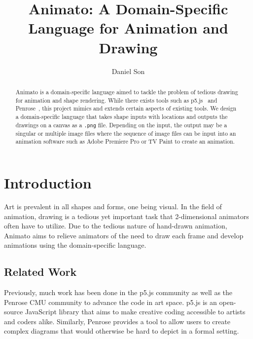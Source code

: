 \documentclass[acmsmall,screen]{acmart}
\begin{document}
\title{Animato: A Domain-Specific Language for Animation and Drawing}

\author{Daniel Son}

\renewcommand{\shortauthors}{Daniel Son}

\renewcommand\footnotetextcopyrightpermission[1]{}
\pagestyle{fancy}
\fancyfoot{}
\makeatletter
\let\@authorsaddresses\@empty
\makeatother

\begin{abstract}
    Animato is a domain-specific language aimed to tackle the problem of tedious drawing for animation and shape rendering.
    While there exists tools such as p5.js~\cite{p5js} and Penrose~\cite{penrose}, this project mimics and extends certain aspects of existing tools.
    We design a domain-specific language that takes shape inputs with locations and outputs the drawings on a canvas as a \texttt{.png} file.
    Depending on the input, the output may be a singular or multiple image files where the sequence of image files can be input into an animation software such as Adobe Premiere Pro or TV Paint to create an animation.
\end{abstract}


\maketitle
\thispagestyle{firstfancy}

\section{Introduction}
Art is prevalent in all shapes and forms, one being visual.
In the field of animation, drawing is a tedious yet important task that 2-dimensional animators often have to utilize.
Due to the tedious nature of hand-drawn animation, Animato aims to relieve animators of the need to draw each frame and develop animations using the domain-specific language.

\subsection{Related Work}
Previously, much work has been done in the p5.js \cite{p5js} community as well as the Penrose \cite{penrose} CMU community to advance the code in art space. 
p5.js is an open-source JavaScript library that aims to make creative coding accessible to artists and coders alike. 
Similarly, Penrose provides a tool to allow users to create complex diagrams that would otherwise be hard to depict in a formal setting.
\end{document}
